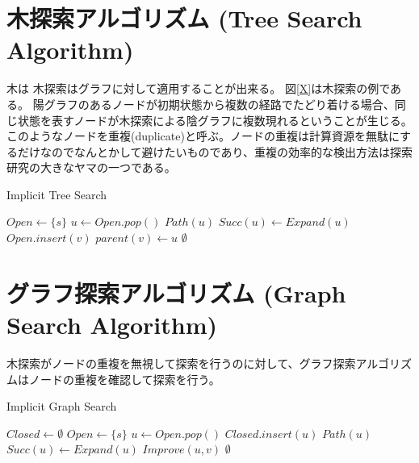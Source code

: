 \documentclass{book}
\begin{document}
\section{木探索アルゴリズム (Tree Search Algorithm)}
\label{sec:tree-search-algorithm}
木は
木探索はグラフに対して適用することが出来る。
図\ref{X}は木探索の例である。
陽グラフのあるノードが初期状態から複数の経路でたどり着ける場合、同じ状態を表すノードが木探索による陰グラフに複数現れるということが生じる。このようなノードを重複(duplicate)と呼ぶ。ノードの重複は計算資源を無駄にするだけなのでなんとかして避けたいものであり、重複の効率的な検出方法は探索研究の大きなヤマの一つである。


\begin{algorithm}
\caption{Implicit Tree Search}
\label{alg:implicit-tree-search}
	$Open \leftarrow \{s\}$\;
	 {
		$u \leftarrow Open.pop()$\;
		 {
			\Return $Path(u)$\;
		}
		$Succ(u) \leftarrow Expand(u)$\;
		 {
			$Open.insert(v)$\;
			$parent(v) \leftarrow u$\;
		}
 	}
	\Return $\emptyset$\;
\end{algorithm}



\section{グラフ探索アルゴリズム (Graph Search Algorithm)}
\label{sec:graph-search-algorithm}

木探索がノードの重複を無視して探索を行うのに対して、グラフ探索アルゴリズムはノードの重複を確認して探索を行う。

\begin{algorithm}
\caption{Implicit Graph Search}
\label{alg:implicit-graph-search}
	$Closed \leftarrow \emptyset$\;
	$Open \leftarrow \{s\}$\;
	 {
		$u \leftarrow Open.pop()$\;
		$Closed.insert(u)$\;
		 {
			\Return $Path(u)$\;
		}
		$Succ(u) \leftarrow Expand(u)$\;
		 {
			$Improve(u, v)$\;
		}
 	}
	\Return $\emptyset$\;
\end{algorithm}
\end{document}
